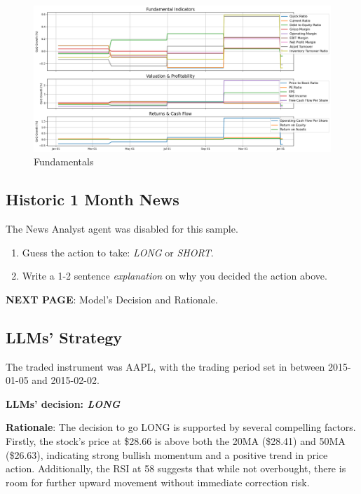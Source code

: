 \documentclass[8pt]{scrartcl}
\begin{document}
\begin{figure}[H]
    \centering
    \includegraphics[width=1\linewidth]{judge_reviews/AAPL_M_gpt-4o-mini/2015-01-05/judge_Fundamental_Indicators.png}
    \caption{Fundamentals}
\end{figure}


\subsection*{Historic 1 Month News}

The News Analyst agent was disabled for this sample.

\begin{tcolorbox}[colback=blue!10, colframe=blue!60, title=\textbf{TASKS}, sharp corners=southwest]
\begin{enumerate}
    \item Guess the action to take: \textit{LONG} or \textit{SHORT}.
    \item Write a 1-2 sentence \textit{explanation} on why you decided the action above.
\end{enumerate}
\end{tcolorbox}

\textbf{NEXT PAGE}: Model's Decision and Rationale.

\newpage

\subsection*{LLMs' Strategy} \label{strategy9}

The traded instrument was AAPL, with the trading period set in between 2015-01-05 and 2015-02-02.

\textbf{LLMs' decision: \textit{LONG}}

\textbf{Rationale}: The decision to go LONG is supported by several compelling factors. Firstly, the stock's price at \$28.66 is above both the 20MA (\$28.41) and 50MA (\$26.63), indicating strong bullish momentum and a positive trend in price action. Additionally, the RSI at 58 suggests that while not overbought, there is room for further upward movement without immediate correction risk.
\end{document}

